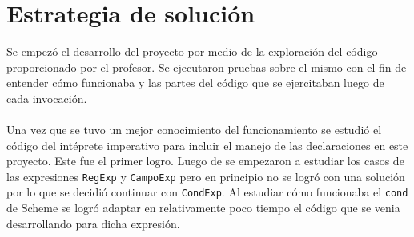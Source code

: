 \documentclass[12pt, times]{simauth}
\begin{document}

\title{
    { \fontsize{30}{1} \selectfont{
        Proyecto 2: Extensión del intérprete de un lenguaje funcional }
    }
}

\author{
    { \fontsize{14}{1} \selectfont{
        Carlos Martín Flores González, 2015183528 \\
        Willard Zamora Cárdenas, 2017239202\\
        Profesor: Ignacio Trejos Zelaya \\
        19 de Junio del 2018
        }
    }
}

%



\maketitle 

\pagebreak

\tableofcontents

\section{Estrategia de solución}
Se empezó el desarrollo del proyecto por medio de la exploración del código proporcionado por el profesor. Se ejecutaron pruebas sobre el mismo con el fin de entender cómo funcionaba y las partes del código que se ejercitaban luego de cada invocación.

\paragraph{}Una vez que se tuvo un mejor conocimiento del funcionamiento se estudió el código del intéprete imperativo para incluir el manejo de las declaraciones en este proyecto. Este fue el primer logro. Luego de se empezaron a estudiar los casos de las expresiones \texttt{RegExp} y \texttt{CampoExp} pero en principio no se logró con una solución por lo que se decidió continuar con \texttt{CondExp}. Al estudiar cómo funcionaba el \texttt{cond} de Scheme se logró adaptar en relativamente poco tiempo el código que se venia desarrollando para dicha expresión.
\end{document}
